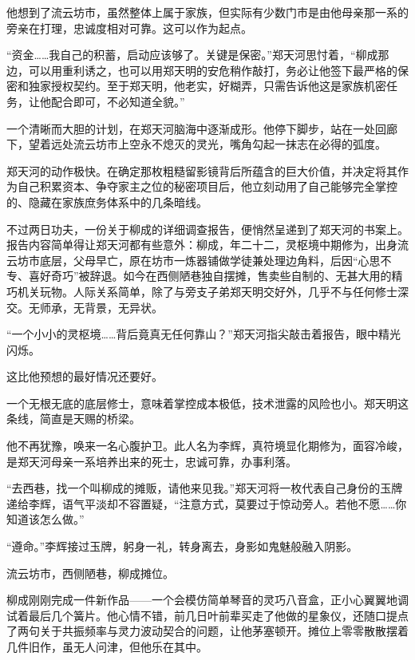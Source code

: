他想到了流云坊市，虽然整体上属于家族，但实际有少数门市是由他母亲那一系的旁亲在打理，忠诚度相对可靠。这可以作为起点。

“资金……我自己的积蓄，启动应该够了。关键是保密。”郑天河思忖着，“柳成那边，可以用重利诱之，也可以用郑天明的安危稍作敲打，务必让他签下最严格的保密和独家授权契约。至于郑天明，他老实，好糊弄，只需告诉他这是家族机密任务，让他配合即可，不必知道全貌。”

一个清晰而大胆的计划，在郑天河脑海中逐渐成形。他停下脚步，站在一处回廊下，望着远处流云坊市上空永不熄灭的灵光，嘴角勾起一抹志在必得的弧度。

\vspace{2em}

郑天河的动作极快。在确定那枚粗糙留影镜背后所蕴含的巨大价值，并决定将其作为自己积累资本、争夺家主之位的秘密项目后，他立刻动用了自己能够完全掌控的、隐藏在家族庶务体系中的几条暗线。

不过两日功夫，一份关于柳成的详细调查报告，便悄然呈递到了郑天河的书案上。报告内容简单得让郑天河都有些意外：柳成，年二十二，灵枢境中期修为，出身流云坊市底层，父母早亡，原在坊市一炼器铺做学徒兼处理边角料，后因“心思不专、喜好奇巧”被辞退。如今在西侧陋巷独自摆摊，售卖些自制的、无甚大用的精巧机关玩物。人际关系简单，除了与旁支子弟郑天明交好外，几乎不与任何修士深交。无师承，无背景，无异状。

“一个小小的灵枢境……背后竟真无任何靠山？”郑天河指尖敲击着报告，眼中精光闪烁。

这比他预想的最好情况还要好。

一个无根无底的底层修士，意味着掌控成本极低，技术泄露的风险也小。郑天明这条线，简直是天赐的桥梁。

他不再犹豫，唤来一名心腹护卫。此人名为李辉，真符境显化期修为，面容冷峻，是郑天河母亲一系培养出来的死士，忠诚可靠，办事利落。

“去西巷，找一个叫柳成的摊贩，请他来见我。”郑天河将一枚代表自己身份的玉牌递给李辉，语气平淡却不容置疑，“注意方式，莫要过于惊动旁人。若他不愿……你知道该怎么做。”

“遵命。”李辉接过玉牌，躬身一礼，转身离去，身影如鬼魅般融入阴影。

\vspace{2em}

流云坊市，西侧陋巷，柳成摊位。

柳成刚刚完成一件新作品——一个会模仿简单琴音的灵巧八音盒，正小心翼翼地调试着最后几个簧片。他心情不错，前几日叶前辈买走了他做的星象仪，还随口提点了两句关于共振频率与灵力波动契合的问题，让他茅塞顿开。摊位上零零散散摆着几件旧作，虽无人问津，但他乐在其中。

